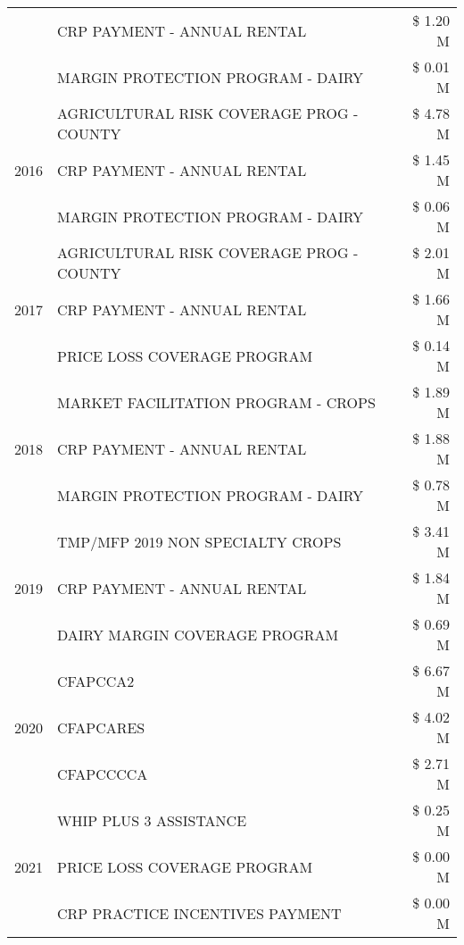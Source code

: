 \begin{tabular}{llr}
 & CRP PAYMENT - ANNUAL RENTAL & \$ 1.20 M \\
 & MARGIN PROTECTION PROGRAM - DAIRY & \$ 0.01 M \\
\cline{1-3}
\multirow[t]{3}{*}{2016} & AGRICULTURAL RISK COVERAGE PROG - COUNTY & \$ 4.78 M \\
 & CRP PAYMENT - ANNUAL RENTAL & \$ 1.45 M \\
 & MARGIN PROTECTION PROGRAM - DAIRY & \$ 0.06 M \\
\cline{1-3}
\multirow[t]{3}{*}{2017} & AGRICULTURAL RISK COVERAGE PROG - COUNTY & \$ 2.01 M \\
 & CRP PAYMENT - ANNUAL RENTAL & \$ 1.66 M \\
 & PRICE LOSS COVERAGE PROGRAM & \$ 0.14 M \\
\cline{1-3}
\multirow[t]{3}{*}{2018} & MARKET FACILITATION PROGRAM - CROPS & \$ 1.89 M \\
 & CRP PAYMENT - ANNUAL RENTAL & \$ 1.88 M \\
 & MARGIN PROTECTION PROGRAM - DAIRY & \$ 0.78 M \\
\cline{1-3}
\multirow[t]{3}{*}{2019} & TMP/MFP 2019 NON SPECIALTY CROPS & \$ 3.41 M \\
 & CRP PAYMENT - ANNUAL RENTAL & \$ 1.84 M \\
 & DAIRY MARGIN COVERAGE PROGRAM & \$ 0.69 M \\
\cline{1-3}
\multirow[t]{3}{*}{2020} & CFAPCCA2 & \$ 6.67 M \\
 & CFAPCARES & \$ 4.02 M \\
 & CFAPCCCCA & \$ 2.71 M \\
\cline{1-3}
\multirow[t]{3}{*}{2021} & WHIP PLUS 3 ASSISTANCE & \$ 0.25 M \\
 & PRICE LOSS COVERAGE PROGRAM & \$ 0.00 M \\
 & CRP PRACTICE INCENTIVES PAYMENT & \$ 0.00 M \\
\cline{1-3}
\bottomrule
\end{tabular}
